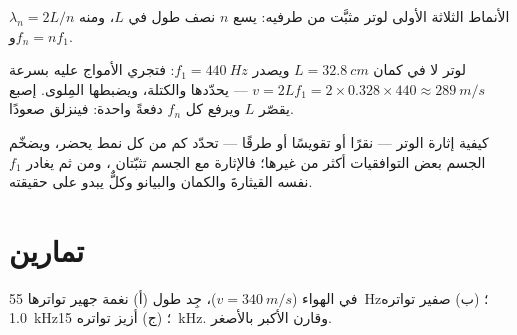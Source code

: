 \begin{omfigure}

{\small الأنماط الثلاثة الأولى لوتر مثبَّت من طرفيه: يسع $n$
نصف طول  في $L$، ومنه $\lambda_n = 2L/n$ و$f_n = nf_1$.}
\end{omfigure}

\begin{example}\label{ex:g12:sound-acoustics:violin}
لوتر لا في كمان $L = \qty{32.8}{cm}$ ويصدر
$f_1 = \qty{440}{Hz}$: فتجري الأمواج عليه بسرعة
$v = 2Lf_1 = 2 \times 0.328 \times 440 \approx \qty{289}{m/s}$ ---
يحدّدها  والكتلة، ويضبطها المِلوى.  إصبع
يقصّر $L$ ويرفع كل $f_n$ دفعةً واحدة: فينزلق  صعودًا.
\end{example}

\begin{remark}\label{rem:g12:sound-acoustics:instruments}
كيفية إثارة الوتر --- نقرًا أو تقويسًا أو طرقًا --- تحدّد كم
من كل نمط يحضر، ويضخّم الجسم بعض التوافقيات
أكثر من غيرها؛ فالإثارة مع الجسم تثبّتان ، ومن ثم يغادر $f_1$
نفسه القيثارةَ والكمان والبيانو وكلٌّ يبدو على حقيقته.
\end{remark}

\section{تمارين}

\begin{exercise}[$\star$]\label{exo:g12:sound-acoustics:1}
في الهواء ($v = \qty{340}{m/s}$)، جِد طول  (أ) نغمة جهير
تواترها \qty{55}{Hz}؛ (ب) صفير تواتره \qty{1.0}{kHz}؛ (ج) أزيز
تواتره \qty{15}{kHz}. وقارن الأكبر بالأصغر.
\end{exercise}

